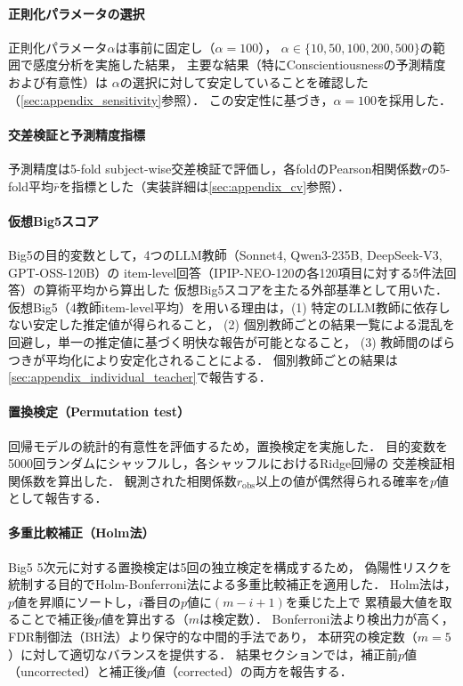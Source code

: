 \documentclass[dvipdfmx,11pt,a4paper]{bxjsarticle}
\renewcommand{\_}{\paperorigunderscore\allowbreak}%
\begin{document}
\paragraph{正則化パラメータの選択}
正則化パラメータ$\alpha$は事前に固定し（$\alpha = 100$），
$\alpha \in \{10, 50, 100, 200, 500\}$の範囲で感度分析を実施した結果，
主要な結果（特にConscientiousnessの予測精度および有意性）は
$\alpha$の選択に対して安定していることを確認した（\ref{sec:appendix_sensitivity}参照）．
この安定性に基づき，$\alpha = 100$を採用した．

\paragraph{交差検証と予測精度指標}
予測精度は5-fold subject-wise交差検証で評価し，各foldのPearson相関係数$r$の5-fold平均$\bar{r}$を指標とした（実装詳細は\ref{sec:appendix_cv}参照）．

\paragraph{仮想Big5スコア}
Big5の目的変数として，4つのLLM教師（Sonnet4, Qwen3-235B, DeepSeek-V3, GPT-OSS-120B）の
item-level回答（IPIP-NEO-120の各120項目に対する5件法回答）の算術平均から算出した
仮想Big5スコアを主たる外部基準として用いた．
仮想Big5（4教師item-level平均）を用いる理由は，(1) 特定のLLM教師に依存しない安定した推定値が得られること，
(2) 個別教師ごとの結果一覧による混乱を回避し，単一の推定値に基づく明快な報告が可能となること，
(3) 教師間のばらつきが平均化により安定化されることによる．
個別教師ごとの結果は\ref{sec:appendix_individual_teacher}で報告する．

\paragraph{置換検定（Permutation test）}
回帰モデルの統計的有意性を評価するため，置換検定を実施した．
目的変数を5000回ランダムにシャッフルし，各シャッフルにおけるRidge回帰の
交差検証相関係数を算出した．
観測された相関係数$r_{\text{obs}}$以上の値が偶然得られる確率を$p$値として報告する．

\paragraph{多重比較補正（Holm法）}
Big5 5次元に対する置換検定は5回の独立検定を構成するため，
偽陽性リスクを統制する目的でHolm-Bonferroni法\cite{holm1979}による多重比較補正を適用した．
Holm法は，$p$値を昇順にソートし，$i$番目の$p$値に$(m - i + 1)$を乗じた上で
累積最大値を取ることで補正後$p$値を算出する（$m$は検定数）．
Bonferroni法より検出力が高く，FDR制御法（BH法）より保守的な中間的手法であり，
本研究の検定数（$m = 5$）に対して適切なバランスを提供する．
結果セクションでは，補正前$p$値（uncorrected）と補正後$p$値（corrected）の両方を報告する．
\end{document}
